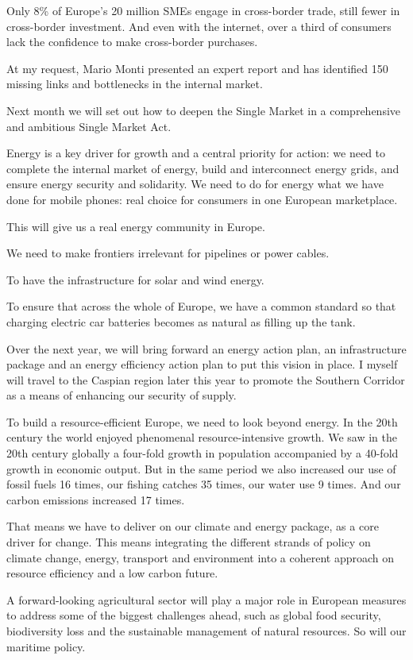 \documentclass[a4paper,11pt]{article}
\begin{document}
Only 8\% of Europe's 20 million SMEs engage in cross-border trade, still fewer in cross-border investment. And even with the internet, over a third of consumers lack the confidence to make cross-border purchases.

At my request, Mario Monti presented an expert report and has identified 150 missing links and bottlenecks in the internal market.

Next month we will set out how to deepen the Single Market in a comprehensive and ambitious Single Market Act.

Energy is a key driver for growth and a central priority for action: we need to complete the internal market of energy, build and interconnect energy grids, and ensure energy security and solidarity. We need to do for energy what we have done for mobile phones: real choice for consumers in one European marketplace.

This will give us a real energy community in Europe.

We need to make frontiers irrelevant for pipelines or power cables.

To have the infrastructure for solar and wind energy.

To ensure that across the whole of Europe, we have a common standard so that charging electric car batteries becomes as natural as filling up the tank.

Over the next year, we will bring forward an energy action plan, an infrastructure package and an energy efficiency action plan to put this vision in place. I myself will travel to the Caspian region later this year to promote the Southern Corridor as a means of enhancing our security of supply.

To build a resource-efficient Europe, we need to look beyond energy. In the 20th century the world enjoyed phenomenal resource-intensive growth. We saw in the 20th century globally a four-fold growth in population accompanied by a 40-fold growth in economic output. But in the same period we also increased our use of fossil fuels 16 times, our fishing catches 35 times, our water use 9 times. And our carbon emissions increased 17 times.

That means we have to deliver on our climate and energy package, as a core driver for change. This means integrating the different strands of policy on climate change, energy, transport and environment into a coherent approach on resource efficiency and a low carbon future.

A forward-looking agricultural sector will play a major role in European measures to address some of the biggest challenges ahead, such as global food security, biodiversity loss and the sustainable management of natural resources. So will our maritime policy.
\end{document}
